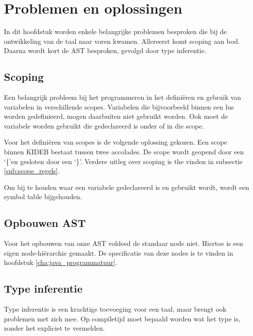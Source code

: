 \chapter{Problemen en oplossingen} %
\label{cha:problemen_en_oplossingen}
In dit hoofdstuk worden enkele belangrijke problemen besproken die bij de ontwikkeling van de taal naar voren kwamen. Allereerst komt scoping aan bod. Daarna wordt kort de AST besproken, gevolgd door type inferentie. 
\section{Scoping} %
\label{sec:scoping}
Een belangrijk probleem bij het programmeren in het defini\"eren en gebruik van variabelen in verschillende scopes. Variabelen die bijvoorbeeld binnen een lus worden gedefinieerd, mogen daarbuiten niet gebruikt worden. Ook moet de variabele worden gebruikt die gedeclareerd is onder of in die scope.

Voor het defini\"eren van scopes is de volgende oplossing gekozen. Een scope binnen KIDEB bestaat tussen twee accolades. De scope wordt geopend door een \textquoteleft\{\textquoteright en gesloten door een \textquoteleft\}\textquoteright. Verdere uitleg over scoping is the vinden in subsectie \ref{sub:scope_regels}.

Om bij te houden waar een variabele gedeclareerd is en gebruikt wordt, wordt een symbol table bijgehouden. 

\section{Opbouwen AST} %
\label{sec:opbouwen_ast}
Voor het opbouwen van onze AST voldeed de standaar node niet. Hiertoe is een eigen node-hi\"erarchie gemaakt. De specificatie van deze nodes is te vinden in hoofdstuk \ref{cha:java_programmatuur}.

\section{Type inferentie} %
\label{sec:type_inferentie}
Type inferentie is een krachtige toevoeging voor een taal, maar brengt ook problemen met zich mee. Op compiletijd moet bepaald worden wat het type is, zonder het expliciet te vermelden.

\clearpage